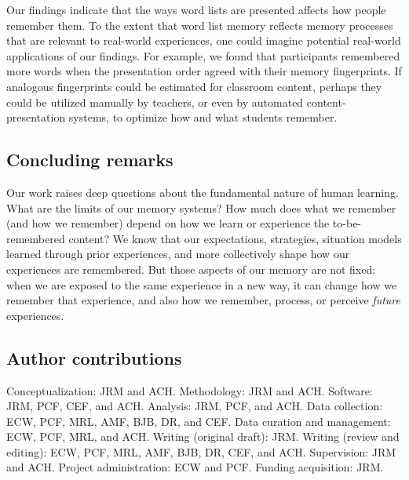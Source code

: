 \documentclass[11pt]{article}
\begin{document}
Our findings indicate that the ways word lists are presented affects how people
remember them. To the extent that word list memory reflects memory processes
that are relevant to real-world experiences, one could imagine potential
real-world applications of our findings. For example, we found that
participants remembered more words when the presentation order agreed with
their memory fingerprints. If analogous fingerprints could be estimated for
classroom content, perhaps they could be utilized manually by teachers, or even
by automated content-presentation systems, to optimize how and what students
remember.



\subsection*{Concluding remarks}

Our work raises deep questions about the fundamental nature of human learning.
What are the limits of our memory systems? How much does what we remember (and
how we remember) depend on how we learn or experience the to-be-remembered
content? We know that our expectations, strategies, situation models learned
through prior experiences, and more collectively shape how our experiences are
remembered. But those aspects of our memory are not fixed: when we are exposed
to the same experience in a new way, it can change how we remember
that experience, and also how we remember, process, or perceive
\textit{future} experiences.

\subsection*{Author contributions}

Conceptualization: JRM and ACH. Methodology: JRM and ACH. Software: JRM, PCF,
CEF, and ACH. Analysis: JRM, PCF, and ACH. Data collection: ECW, PCF, MRL, AMF,
BJB, DR, and CEF. Data curation and management: ECW, PCF, MRL, and ACH. Writing
(original draft): JRM. Writing (review and editing): ECW, PCF, MRL, AMF, BJB,
DR, CEF, and ACH. Supervision: JRM and ACH. Project administration: ECW and
PCF. Funding acquisition: JRM.
\end{document}
